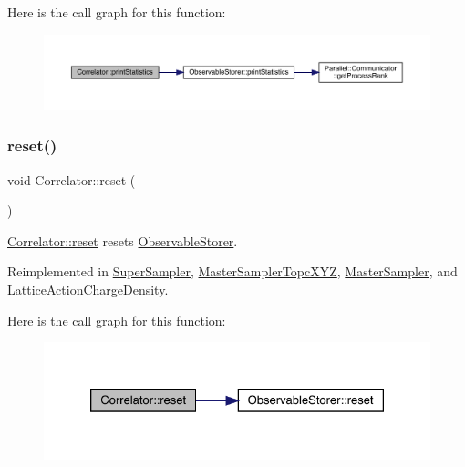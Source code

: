 Here is the call graph for this function\+:\nopagebreak
\begin{figure}[H]
\begin{center}
\leavevmode
\includegraphics[width=350pt]{class_correlator_a2168d677f547769784781d2e2aaa53cf_cgraph}
\end{center}
\end{figure}
\mbox{\label{class_correlator_aacca40262d2cd62f0a3964e832f948c1}} 
\subsubsection{\texorpdfstring{reset()}{reset()}}
{\footnotesize\ttfamily void Correlator\+::reset (\begin{DoxyParamCaption}{ }\end{DoxyParamCaption})\hspace{0.3cm}{\ttfamily [virtual]}}



\mbox{\hyperlink{class_correlator_aacca40262d2cd62f0a3964e832f948c1}{Correlator\+::reset}} resets \mbox{\hyperlink{class_observable_storer}{Observable\+Storer}}. 



Reimplemented in \mbox{\hyperlink{class_super_sampler_ab2f028561e015500fac1e3093aa4a725}{Super\+Sampler}}, \mbox{\hyperlink{class_master_sampler_topc_x_y_z_aef8d0b1b431711c6410cfece1c007b4a}{Master\+Sampler\+Topc\+X\+YZ}}, \mbox{\hyperlink{class_master_sampler_a275a032513db03c899056fd07d71cc89}{Master\+Sampler}}, and \mbox{\hyperlink{class_lattice_action_charge_density_aebbc2cc72334e7b33d9cce2ad469280b}{Lattice\+Action\+Charge\+Density}}.

Here is the call graph for this function\+:\nopagebreak
\begin{figure}[H]
\begin{center}
\leavevmode
\includegraphics[width=326pt]{class_correlator_aacca40262d2cd62f0a3964e832f948c1_cgraph}
\end{center}
\end{figure}
\mbox{\label{class_correlator_a35197b1d12b62ef30b79c0138a26456e}} 
